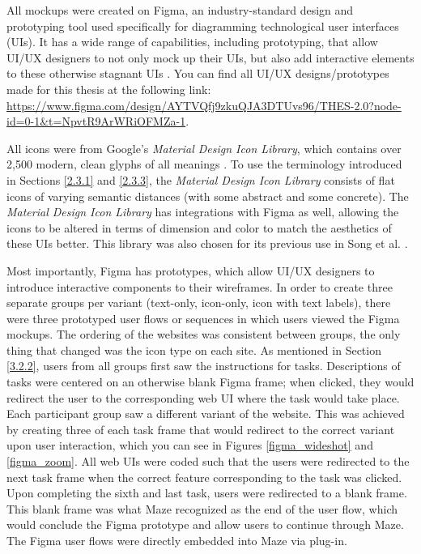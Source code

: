 \documentclass[12pt,twoside]{reedthesis}
\begin{document}
        All mockups were created on Figma, an industry-standard design and prototyping tool used specifically for diagramming technological user interfaces (UIs). It has a wide range of capabilities, including prototyping, that allow UI/UX designers to not only mock up their UIs, but also add interactive elements to these otherwise stagnant UIs \cite{what_is_figma}. You can find all UI/UX designs/prototypes made for this thesis at the following link: \url{https://www.figma.com/design/AYTVQfj9zkuQJA3DTUvs96/THES-2.0?node-id=0-1&t=NpvtR9ArWRiOFMZa-1}.
        
        All icons were from Google's \textit{Material Design Icon Library}, which contains over 2,500 modern, clean glyphs of all meanings \cite{material_library}. To use the terminology introduced in Sections \ref{2.3.1} and \ref{2.3.3}, the \textit{Material Design Icon Library} consists of flat icons of varying semantic distances (with some abstract and some concrete). The \textit{Material Design Icon Library} has integrations with Figma as well, allowing the icons to be altered in terms of dimension and color to match the aesthetics of these UIs better. This library was also chosen for its previous use in Song et al. \cite{song_developing_2024}.  

        Most importantly, Figma has prototypes, which allow UI/UX designers to introduce interactive components to their wireframes. In order to create three separate groups per variant (text-only, icon-only, icon with text labels), there were three prototyped user flows or sequences in which users viewed the Figma mockups. The ordering of the websites was consistent between groups, the only thing that changed was the icon type on each site. As mentioned in Section \ref{3.2.2}, users from all groups first saw the instructions for tasks. Descriptions of tasks were centered on an otherwise blank Figma frame; when clicked, they would redirect the user to the corresponding web UI where the task would take place. Each participant group saw a different variant of the website. This was achieved by creating three of each task frame that would redirect to the correct variant upon user interaction, which you can see in Figures \ref{figma_wideshot} and \ref{figma_zoom}. All web UIs were coded such that the users were redirected to the next task frame when the correct feature corresponding to the task was clicked. Upon completing the sixth and last task, users were redirected to a blank frame. This blank frame was what Maze recognized as the end of the user flow, which would conclude the Figma prototype and allow users to continue through Maze. The Figma user flows were directly embedded into Maze via plug-in. 
\end{document}
